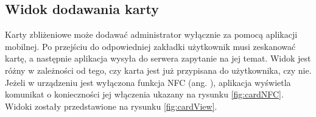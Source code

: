 \subsection{Widok dodawania karty}

Karty zbliżeniowe może dodawać administrator wyłącznie za pomocą aplikacji mobilnej. Po przejściu do odpowiedniej zakładki użytkownik musi zeskanować kartę, a następnie aplikacja wysyła do serwera zapytanie na jej temat. Widok jest różny w zależności od tego, czy karta jest już przypisana do użytkownika, czy nie. Jeżeli w urządzeniu jest wyłączona funkcja NFC (ang. ), aplikacja wyświetla komunikat o konieczności jej włączenia ukazany na rysunku \ref{fig:cardNFC}. Widoki zostały przedstawione na rysunku \ref{fig:cardView}.

\begin{figure}[H]
    \centering
    \begin{subfigure}[b]{0.3\textwidth}
        \centering

\end{subfigure}
\end{figure}
